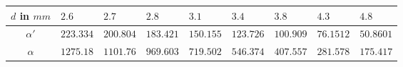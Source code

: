 \begin{tabular}{c|*{8}{*{1}{l}}}
$d$ in $\unit{mm}$ & $2.6$ & $2.7$ & $2.8$ & $3.1$ & $3.4$ & $3.8$ & $4.3$ & $4.8$ \\ \hline
$\alpha'$ & $223.334$ & $200.804$ & $183.421$ & $150.155$ & $123.726$ & $100.909$ & $76.1512$ & $50.8601$ \\ \hline
$\alpha$ & $1275.18$ & $1101.76$ & $969.603$ & $719.502$ & $546.374$ & $407.557$ & $281.578$ & $175.417$\end{tabular}
